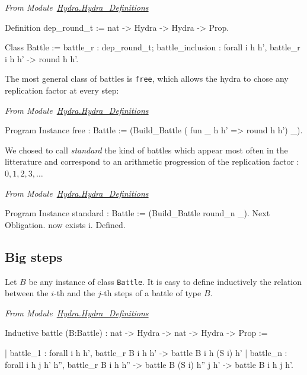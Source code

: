 \documentclass[a4paper]{book}
\begin{document}
\vspace{4pt}
\emph{From Module~\href{../src/html/hydras.Hydra.Hydra_Definitions.html}{Hydra.Hydra\_Definitions}}
\label{types:Battle}

\begin{Coqsrc}
Definition dep_round_t := nat -> Hydra -> Hydra -> Prop.

Class Battle :=  {battle_r : dep_round_t;
                  battle_inclusion : forall i h h',
                      battle_r i h h' -> round h h'}.

\end{Coqsrc}

The most general class of battles is \texttt{free}, which allows the hydra to chose any replication factor at every step:

\vspace{4pt}
\emph{From Module~\href{../src/html/hydras.Hydra.Hydra_Definitions.html\#free}{Hydra.Hydra\_Definitions}}

\begin{Coqsrc}
Program Instance free : Battle :=
  (Build_Battle ( fun _  h h' => round h h') _).
\end{Coqsrc}

We chosed to call \emph{standard} the kind of battles which appear  most often in the litterature and correspond to an arithmetic progression of the replication factor : $0,1,2,3, \dots$

\vspace{4pt}
\emph{From Module~\href{../src/html/hydras.Hydra.Hydra_Definitions.html\#standard}{Hydra.Hydra\_Definitions}}

\begin{Coqsrc}
Program Instance standard : Battle := (Build_Battle round_n _).
Next Obligation.
  now exists i.  
Defined.
\end{Coqsrc}


\subsection{Big steps}

Let $B$ be any instance of class \texttt{Battle}. It is easy to define inductively the relation between the $i$-th and the $j$-th steps of a battle of type $B$.

\vspace{4pt}
\emph{From Module~\href{../src/html/hydras.Hydra.Hydra_Definitions.html\#fight}{Hydra.Hydra\_Definitions}}

\begin{Coqsrc}
Inductive battle (B:Battle) : nat -> Hydra -> nat -> Hydra -> Prop :=

| battle_1 : forall i h  h', battle_r   B i  h h' -> 
                            battle B i h (S i) h'
| battle_n : forall i h  j h' h'',  battle_r  B i h h''  ->
                                   battle B (S i) h'' j h'  ->
                                   battle B i h j h'.
\end{Coqsrc}
\end{document}
